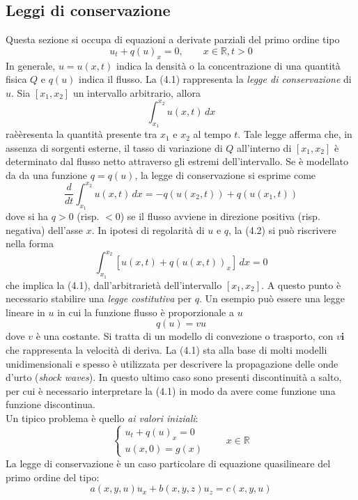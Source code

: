 \documentclass[a4paper,12pt, draft]{article}
\theoremstyle{break}
\numberwithin{equation}{section}
\begin{document}
\subsection{Leggi di conservazione}
Questa sezione si occupa di equazioni a derivate parziali del primo ordine tipo
\begin{equation}
  u_t + q(u)_x = 0, \qquad x \in \mathbb{R}, t > 0
\end{equation}
In generale, \(u = u(x,t)\) indica la densità o la concentrazione di una quantità fisica \(Q\) e \(q(u)\) indica il flusso. La (4.1) rappresenta la \emph{legge di conservazione} di \(u\). Sia \([x_1, x_2]\) un intervallo arbitrario, allora 
\[
  \int_{x_1}^{x_2} u(x,t) \, dx
\]
raèèresenta la quantità presente tra \(x_1 \mbox{ e }x_2\) al tempo \(t\). Tale legge afferma che, in assenza di sorgenti esterne, il tasso di variazione di \(Q\) all'interno di \([x_1, x_2]\) è determinato dal flusso netto attraverso gli estremi dell'intervallo. Se è modellato da da una funzione \(q = q(u)\), la legge di conservazione si esprime come
\begin{equation}
  \frac{d}{dt} \int_{x_1}^{x_2} u(x,t) \, dx = -q(u(x_2, t)) + q(u(x_1, t))
\end{equation} 
dove si ha \(q > 0\) (risp. \(< 0\)) se il flusso avviene in direzione positiva (risp. negativa) dell'asse \(x\). In ipotesi di regolarità di \(u\) e \(q\), la (4.2) si può riscrivere nella forma 
\[
  \int_{x_1}^{x_2} [u(x,t) + q(u(x,t))_x] \, dx = 0 
\]
che implica la (4.1), dall'arbitrarietà dell'intervallo \([x_1, x_2]\). A questo punto è necessario stabilire una \emph{legge costitutiva} per \(q\). Un esempio può essere una legge lineare in \(u\) in cui la funzione flusso è proporzionale a \(u\)
\[
  q(u) = vu
\]
dove \(v\) è una costante. Si tratta di un modello di convezione o trasporto, con \(v\bm{i}\) che rappresenta la velocità di deriva. 
La (4.1) sta alla base di molti modelli unidimensionali e spesso è utilizzata per descrivere la propagazione delle onde d'urto (\emph{shock waves}). In questo ultimo caso sono presenti discontinuità a salto, per cui è necessario interpretare la (4.1) in modo da avere come funzione una funzione discontinua. \\
Un tipico problema è quello \emph{ai valori iniziali}:
\begin{equation}
  \begin{cases}
    u_t + q(u)_x = 0 \\
    u(x,0) = g(x)
  \end{cases}
  \qquad x \in \mathbb{R}
\end{equation}
La legge di conservazione è un caso particolare di equazione quasilineare del primo ordine del tipo:
\[
  a(x,y,u)u_x + b(x,y,z)u_z = c(x,y,u)
\]
\end{document}
